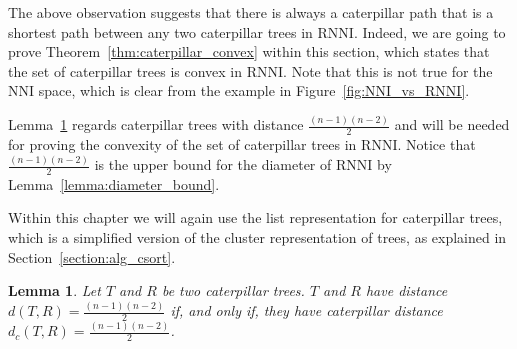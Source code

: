 \documentclass{amsart}
\newcommand{\nni}{\mathrm{NNI}}
\newcommand{\rnni}{\mathrm{RNNI}}
\newtheorem{lemma}[definition]{Lemma}
\begin{document}
The above observation suggests that there is always a caterpillar path that is a shortest path between any two caterpillar trees in $\rnni$.
Indeed, we are going to prove Theorem~\ref{thm:caterpillar_convex} within this section, which states that the set of caterpillar trees is convex in $\rnni$.
Note that this is not true for the $\nni$ space, which is clear from the example in Figure~\ref{fig:NNI_vs_RNNI}.

Lemma~\ref{lemma:caterpillar_dist=diameter} regards caterpillar trees with distance $\frac{(n-1)(n-2)}{2}$ and will be needed for proving the convexity of the set of caterpillar trees in $\rnni$.
Notice that $\frac{(n-1)(n-2)}{2}$ is the upper bound for the diameter of $\rnni$ by Lemma~\ref{lemma:diameter_bound}.

Within this chapter we will again use the list representation for caterpillar trees, which is a simplified version of the cluster representation of trees, as explained in Section~\ref{section:alg_csort}.

\begin{lemma}
Let $T$ and $R$ be two caterpillar trees.
$T$ and $R$ have distance $d(T,R) = \frac{(n-1)(n-2)}{2}$ if, and only if, they have caterpillar distance $d_c(T,R) = \frac{(n-1)(n-2)}{2}$.
\label{lemma:caterpillar_dist=diameter}
\end{lemma}
\end{document}
